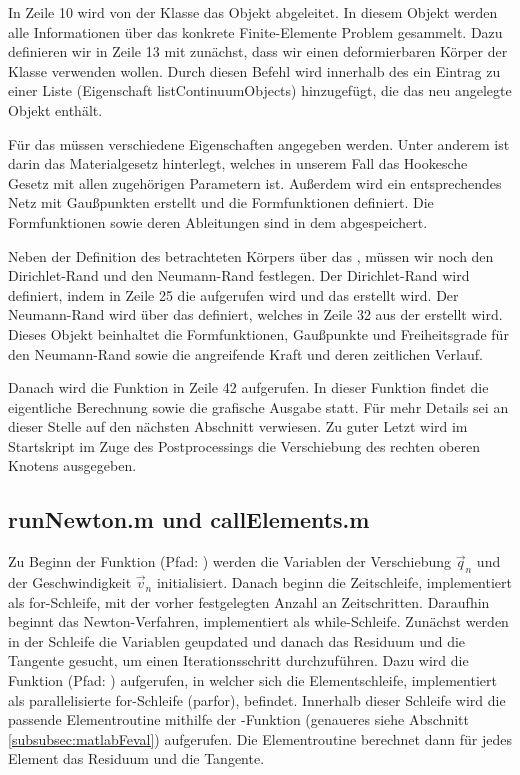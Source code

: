 \documentclass[12pt,bibstyle=none,pagenumberinfooter]{ifmdocument}
\begin{document}
In Zeile 10 wird von der Klasse  das Objekt  abgeleitet. In diesem Objekt werden alle Informationen über das konkrete Finite-Elemente Problem gesammelt. Dazu definieren wir in Zeile 13 mit  zunächst, dass wir einen deformierbaren Körper der Klasse  verwenden wollen. Durch diesen Befehl wird innerhalb des  ein Eintrag zu einer Liste (Eigenschaft listContinuumObjects) hinzugefügt, die das neu angelegte Objekt  enthält.

Für das  müssen verschiedene Eigenschaften angegeben werden. Unter anderem ist darin das Materialgesetz hinterlegt, welches in unserem Fall das Hookesche Gesetz mit allen zugehörigen Parametern ist. Außerdem wird ein entsprechendes Netz mit Gaußpunkten erstellt und die Formfunktionen definiert. Die Formfunktionen sowie deren Ableitungen sind in dem  abgespeichert.

Neben der Definition des betrachteten Körpers über das , müssen wir noch den Dirichlet-Rand und den Neumann-Rand festlegen. Der Dirichlet-Rand wird definiert, indem in Zeile 25 die  aufgerufen wird und das  erstellt wird. Der Neumann-Rand wird über das  definiert, welches in Zeile 32 aus der  erstellt wird. Dieses Objekt beinhaltet die Formfunktionen, Gaußpunkte und Freiheitsgrade f\"ur den Neumann-Rand sowie die angreifende Kraft und deren zeitlichen Verlauf.

Danach wird die Funktion  in Zeile 42 aufgerufen. In dieser Funktion findet die eigentliche Berechnung sowie die grafische Ausgabe statt. Für mehr Details sei an dieser Stelle auf den n\"achsten Abschnitt verwiesen. Zu guter Letzt wird im Startskript im Zuge des Postprocessings die Verschiebung des rechten oberen Knotens ausgegeben.

\subsection{runNewton.m und callElements.m}
Zu Beginn der Funktion  (Pfad: ) werden die Variablen der Verschiebung $\vec{q}_n$ und der Geschwindigkeit $\vec{v}_n$ initialisiert. Danach beginn die Zeitschleife, implementiert als for-Schleife, mit der vorher festgelegten Anzahl an Zeitschritten. Daraufhin beginnt das Newton-Verfahren, implementiert als while-Schleife. Zun\"achst werden in der Schleife die Variablen geupdated und danach das Residuum und die Tangente gesucht, um einen Iterationsschritt durchzuf\"uhren. Dazu wird die Funktion  (Pfad: ) aufgerufen, in welcher sich die Elementschleife, implementiert als parallelisierte for-Schleife (parfor), befindet. Innerhalb dieser Schleife wird die passende Elementroutine mithilfe der \matlab -Funktion  (genaueres siehe Abschnitt \ref{subsubsec:matlabFeval}) aufgerufen. Die Elementroutine berechnet dann f\"ur jedes Element das Residuum und die Tangente.
\end{document}
